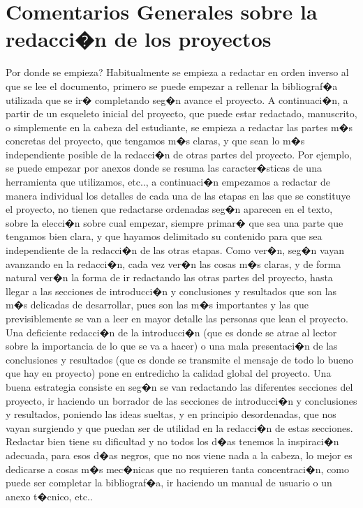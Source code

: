 \documentclass[12pt,letter,spanish]{book}
\begin{document}
\chapter[Redacci�n de Proyectos]{Comentarios Generales sobre la redacci�n de los proyectos}


Por donde se empieza? Habitualmente se empieza a redactar en orden inverso al que se lee el documento, primero
se puede empezar a rellenar la bibliograf�a utilizada que se ir� completando seg�n avance el proyecto. A continuaci�n,
a partir de un esqueleto inicial del proyecto, que puede estar redactado, manuscrito, o simplemente en la cabeza del estudiante,
se empieza a redactar las partes m�s concretas del proyecto, que tengamos m�s claras, y que sean lo m�s independiente posible
de la redacci�n de otras partes del proyecto. Por ejemplo, se puede empezar por anexos donde se resuma las caracter�sticas
de una herramienta que utilizamos, etc.., a continuaci�n empezamos a redactar de manera individual los detalles de cada
una de las etapas en las que se constituye el proyecto, no tienen que redactarse ordenadas seg�n aparecen en el texto,
sobre la elecci�n sobre cual empezar, siempre primar� que sea una parte que tengamos bien clara, y que hayamos delimitado
su contenido para que sea independiente de la redacci�n de las otras etapas. Como ver�n, seg�n vayan avanzando en la
redacci�n, cada vez ver�n las cosas m�s claras, y de forma natural ver�n la forma de ir redactando las otras partes del
proyecto, hasta llegar a las secciones de introducci�n y conclusiones y resultados que son las m�s delicadas de desarrollar,
pues son las m�s importantes y las que previsiblemente se van a leer en mayor detalle las personas que lean el proyecto.
Una deficiente redacci�n de la introducci�n (que es donde se atrae al lector sobre la importancia de lo que se va a hacer)
o una mala presentaci�n de las conclusiones y resultados (que es donde se transmite el mensaje de todo lo bueno que hay
en proyecto) pone en entredicho la calidad global del proyecto. Una buena estrategia consiste en seg�n se van redactando
las diferentes secciones del proyecto, ir haciendo un borrador de las secciones de introducci�n y conclusiones y resultados,
poniendo las ideas sueltas, y en principio desordenadas, que nos vayan surgiendo  y que puedan ser de utilidad en la redacci�n
de estas secciones. Redactar bien tiene su dificultad y no todos los d�as tenemos la inspiraci�n adecuada, para esos d�as
negros, que no nos viene nada a la cabeza, lo mejor es dedicarse a cosas m�s mec�nicas que no requieren tanta concentraci�n,
como puede ser completar la bibliograf�a, ir haciendo un manual de usuario o un anexo t�cnico, etc..
\end{document}
